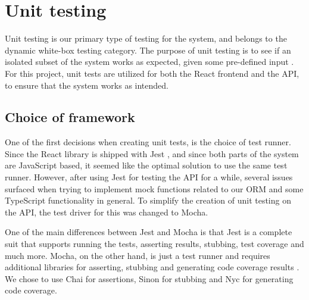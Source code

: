 \section{Unit testing}
Unit testing is our primary type of testing for the system, and belongs to the dynamic white-box testing category.
The purpose of unit testing is to see if an isolated subset of the system works as expected, given some pre-defined input \cite{TestDrivenDevelopment}.
For this project, unit tests are utilized for both the React frontend and the API, to ensure that the system works as intended.

\subsection{Choice of framework}
One of the first decisions when creating unit tests, is the choice of test runner.
Since the React library is shipped with Jest \cite{ReactRunningTests}, and since both parts of the system are JavaScript based, it seemed like the optimal solution to use the same test runner.
However, after using Jest for testing the API for a while, several issues surfaced when trying to implement mock functions related to our ORM and some TypeScript functionality in general.
To simplify the creation of unit testing on the API, the test driver for this was changed to Mocha.

One of the main differences between Jest and Mocha is that Jest is a complete suit that supports running the tests, asserting results, stubbing, test coverage and much more.
Mocha, on the other hand, is just a test runner and requires additional libraries for asserting, stubbing and generating code coverage results \cite{Mocha}.
We chose to use Chai for assertions, Sinon for stubbing and Nyc for generating code coverage.

